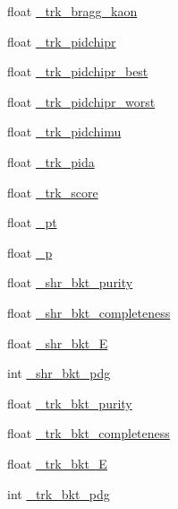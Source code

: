 \begin{DoxyCompactItemize}
\item 
float \hyperlink{classselection_1_1NuMuSelection_a8fb54244ae254a42f6238bca2d7fb34e}{\-\_\-trk\-\_\-bragg\-\_\-kaon}
\item 
float \hyperlink{classselection_1_1NuMuSelection_af65eea94c4d2811de82693751684131d}{\-\_\-trk\-\_\-pidchipr}
\item 
float \hyperlink{classselection_1_1NuMuSelection_ad0b2f58434040e2c9e9304a93252d5e1}{\-\_\-trk\-\_\-pidchipr\-\_\-best}
\item 
float \hyperlink{classselection_1_1NuMuSelection_a0373f32c36b713af9febf4e5e3b6899a}{\-\_\-trk\-\_\-pidchipr\-\_\-worst}
\item 
float \hyperlink{classselection_1_1NuMuSelection_a3ae2c291adeedd490d43b915257553f7}{\-\_\-trk\-\_\-pidchimu}
\item 
float \hyperlink{classselection_1_1NuMuSelection_ae2b400954b0bce9930437be4fdb7fd85}{\-\_\-trk\-\_\-pida}
\item 
float \hyperlink{classselection_1_1NuMuSelection_a2316596a59c6b87ea5aa75716c588117}{\-\_\-trk\-\_\-score}
\item 
float \hyperlink{classselection_1_1NuMuSelection_aab5bb47332ae2489a5ab96078397d075}{\-\_\-pt}
\item 
float \hyperlink{classselection_1_1NuMuSelection_a821979901c138eca118246a1eeedcd80}{\-\_\-p}
\item 
float \hyperlink{classselection_1_1NuMuSelection_a6988cb9e869c0205f44659b3a65bd047}{\-\_\-shr\-\_\-bkt\-\_\-purity}
\item 
float \hyperlink{classselection_1_1NuMuSelection_a18224668e51654b8322757c2db5d8b9d}{\-\_\-shr\-\_\-bkt\-\_\-completeness}
\item 
float \hyperlink{classselection_1_1NuMuSelection_aa6e475979c9554cb14bf7a082385a128}{\-\_\-shr\-\_\-bkt\-\_\-\-E}
\item 
int \hyperlink{classselection_1_1NuMuSelection_ab5695d0d13afa6fe27e38b63951ade58}{\-\_\-shr\-\_\-bkt\-\_\-pdg}
\item 
float \hyperlink{classselection_1_1NuMuSelection_a72c22e0de99d58873fa4e9824e094c50}{\-\_\-trk\-\_\-bkt\-\_\-purity}
\item 
float \hyperlink{classselection_1_1NuMuSelection_a569e5b1199f57a2becbd28ee0202baae}{\-\_\-trk\-\_\-bkt\-\_\-completeness}
\item 
float \hyperlink{classselection_1_1NuMuSelection_a1957763f4a43de544b42a9e04cf83afa}{\-\_\-trk\-\_\-bkt\-\_\-\-E}
\item 
int \hyperlink{classselection_1_1NuMuSelection_afc6475990e683ff735846740580cac9b}{\-\_\-trk\-\_\-bkt\-\_\-pdg}

\end{DoxyCompactItemize}
